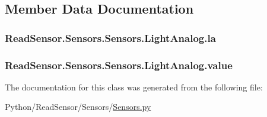 \subsection{Member Data Documentation}
\subsubsection[{\texorpdfstring{la}{la}}]{\setlength{\rightskip}{0pt plus 5cm}Read\+Sensor.\+Sensors.\+Sensors.\+Light\+Analog.\+la}\hypertarget{classReadSensor_1_1Sensors_1_1Sensors_1_1LightAnalog_aa4b4becb12dc426ba3ca572940161087}{}\label{classReadSensor_1_1Sensors_1_1Sensors_1_1LightAnalog_aa4b4becb12dc426ba3ca572940161087}
\subsubsection[{\texorpdfstring{value}{value}}]{\setlength{\rightskip}{0pt plus 5cm}Read\+Sensor.\+Sensors.\+Sensors.\+Light\+Analog.\+value}\hypertarget{classReadSensor_1_1Sensors_1_1Sensors_1_1LightAnalog_aabd7bf3d3ae2138a50cafe651a8b8da6}{}\label{classReadSensor_1_1Sensors_1_1Sensors_1_1LightAnalog_aabd7bf3d3ae2138a50cafe651a8b8da6}


The documentation for this class was generated from the following file\+:\begin{DoxyCompactItemize}
\item 
Python/\+Read\+Sensor/\+Sensors/\hyperlink{Sensors_8py}{Sensors.\+py}\end{DoxyCompactItemize}
